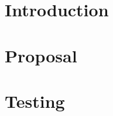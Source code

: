 \section{Introduction}

%
%

\section{Proposal}


%
%
%
%
%
%
%
%
%
%
%
%
%
%
%
%
%
%
%
%

\section{Testing}

